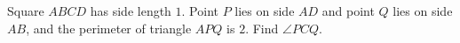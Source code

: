 Square $ABCD$ has side length $1$. Point $P$ lies on side $AD$ and point $Q$ lies on side $AB$, and the perimeter of triangle $APQ$ is $2$. Find $\angle PCQ$.
